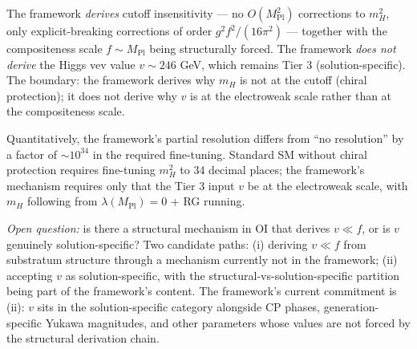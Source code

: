 \documentclass[
]{article}
\begin{document}
The framework \emph{derives} cutoff insensitivity --- no
\(O(M_{\mathrm{Pl}}^2)\) corrections to \(m_H^2\), only
explicit-breaking corrections of order \(g^2 f^2 / (16\pi^2)\) ---
together with the compositeness scale \(f \sim M_{\mathrm{Pl}}\) being
structurally forced. The framework \emph{does not derive} the Higgs vev
value \(v \sim 246\) GeV, which remains Tier 3 (solution-specific). The
boundary: the framework derives why \(m_H\) is not at the cutoff (chiral
protection); it does not derive why \(v\) is at the electroweak scale
rather than at the compositeness scale.

Quantitatively, the framework's partial resolution differs from ``no
resolution'' by a factor of \(\sim 10^{34}\) in the required
fine-tuning. Standard SM without chiral protection requires fine-tuning
\(m_H^2\) to 34 decimal places; the framework's mechanism requires only
that the Tier 3 input \(v\) be at the electroweak scale, with \(m_H\)
following from \(\lambda(M_{\mathrm{Pl}}) = 0\) + RG running.

\emph{Open question:} is there a structural mechanism in OI that derives
\(v \ll f\), or is \(v\) genuinely solution-specific? Two candidate
paths: (i) deriving \(v \ll f\) from substratum structure through a
mechanism currently not in the framework; (ii) accepting \(v\) as
solution-specific, with the structural-vs-solution-specific partition
being part of the framework's content. The framework's current
commitment is (ii): \(v\) sits in the solution-specific category
alongside CP phases, generation-specific Yukawa magnitudes, and other
parameters whose values are not forced by the structural derivation
chain.
\end{document}
